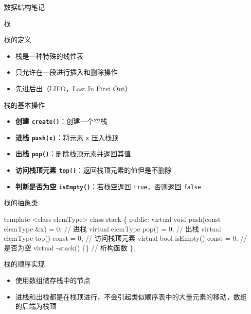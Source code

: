 \documentclass[
  ignorenonframetext,
]{beamer}
\newenvironment{Shaded}{}{}
\newcommand{\NormalTok}[1]{#1}
\providecommand{\tightlist}{%
  \setlength{\itemsep}{0pt}\setlength{\parskip}{0pt}}
\begin{document}
\begin{frame}[fragile]{数据结构笔记}
\begin{block}{栈}
\protect{}\label{ux6808}
\begin{block}{栈的定义}
\protect{}\label{ux6808ux7684ux5b9aux4e49}
\begin{itemize}
\tightlist
\item
  栈是一种特殊的线性表
\item
  只允许在一段进行插入和删除操作
\item
  先进后出（LIFO，Last In First Out）
\end{itemize}


\begin{block}{栈的基本操作}
\protect{}\label{ux6808ux7684ux57faux672cux64cdux4f5c}
\begin{itemize}
\tightlist
\item
  \textbf{创建 \texttt{create()}}：创建一个空栈
\item
  \textbf{进栈 \texttt{push(x)}}：将元素 \texttt{x} 压入栈顶
\item
  \textbf{出栈 \texttt{pop()}}：删除栈顶元素并返回其值
\item
  \textbf{访问栈顶元素 \texttt{top()}}：返回栈顶元素的值但是不删除
\item
  \textbf{判断是否为空 \texttt{isEmpty()}}：若栈空返回
  \texttt{true}，否则返回 \texttt{false}
\end{itemize}
\end{block}

\begin{block}{栈的抽象类}
\protect{}\label{ux6808ux7684ux62bdux8c61ux7c7b}
\begin{Shaded}
\begin{Highlighting}[]
\NormalTok{template \textless{}class elemType\textgreater{}}
\NormalTok{class stack}
\NormalTok{\{}
\NormalTok{  public:}
\NormalTok{    virtual void push(const elemType \&x) = 0;       // 进栈}
\NormalTok{    virtual elemType pop() = 0;                     // 出栈}
\NormalTok{    virtual elemType top() const = 0;               // 访问栈顶元素}
\NormalTok{    virtual bool isEmpty() const = 0;               // 是否为空}
\NormalTok{    virtual \textasciitilde{}stack() \{\}                             // 析构函数}
\NormalTok{\};}
\end{Highlighting}
\end{Shaded}
\end{block}
\end{block}

\begin{block}{栈的顺序实现}
\protect{}\label{ux6808ux7684ux987aux5e8fux5b9eux73b0}
\begin{itemize}
\tightlist
\item
  使用数组储存栈中的节点
\item
  进栈和出栈都是在栈顶进行，不会引起类似顺序表中的大量元素的移动，数组的后端为栈顶
\end{itemize}



\end{block}
\end{block}
\end{frame}
\end{document}
